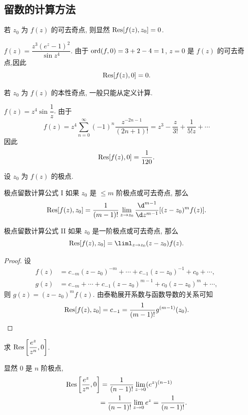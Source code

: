 \subsection{留数的计算方法}

若 $z_0$ 为 $f(z)$ 的可去奇点, 则显然 ${\mathrm{Res}}[f(z),z_0]=0$.

\begin{example}
		$f(z)=\dfrac{z^3(e^z-1)^2}{\sin z^4}$.
	{由于 ${\mathrm{ord}}(f,0)=3+2-4=1$, $z=0$ 是 $f(z)$ 的可去奇点,因此 \[{\mathrm{Res}}[f(z),0]=0.\]
	}
\end{example}

若 $z_0$ 为 $f(z)$ 的本性奇点, 一般只能从定义计算.

\begin{example}
	$f(z)=z^4\sin\dfrac1z$.
{%
	由于
	\[f(z)=z^4\sum_{n=0}^\infty(-1)^n\frac{z^{-2n-1}}{(2n+1)!}
	=z^3-\frac z{3!}+\frac1{5!z}+\cdots\]
}
{%
	因此 \[{\mathrm{Res}}[f(z),0]=\frac1{120}.\]
}
\end{example}

设 $z_0$ 为 $f(z)$ 的极点.

\begin{theorem}{极点留数计算公式 I}
	如果 $z_0$ 是 $\le m$ 阶极点或可去奇点, 那么
	\[\Res[f(z),z_0]=\frac1{(m-1)!}\lim_{z\to z_0}\frac{\d^{m-1}}{\d z^{m-1}}[(z-z_0)^mf(z)].\]
\end{theorem}

\begin{theorem}{极点留数计算公式 II}
	如果 $z_0$ 是一阶极点或可去奇点, 那么
	\[\Res[f(z),z_0]=\liml_{z\to z_0}(z-z_0)f(z).\]
\end{theorem}

\begin{proof}
	设
	\begin{align*}
		f(z)&=c_{-m}(z-z_0)^{-m}+\cdots+c_{-1}(z-z_0)^{-1}+c_0+\cdots,\\
		g(z)&=c_{-m}+\cdots+c_{-1}(z-z_0)^{m-1}+c_0(z-z_0)^m+\cdots,
	\end{align*}
{%
	则 $g(z)=(z-z_0)^mf(z)$.
}%
{%
	由泰勒展开系数与函数导数的关系可知
	\[{\mathrm{Res}}[f(z),z_0]=c_{-1}=\dfrac1{(m-1)!}g^{(m-1)}(z_0).\qedhere\]
}
\end{proof}

\begin{example}
	求 ${\mathrm{Res}}\left[\dfrac{e^z}{z^n},0\right]$.
\end{example}

\begin{solution}
		显然 $0$ 是 $n$ 阶极点,
	{\begin{align*}
			{\mathrm{Res}}\left[\frac{e^z}{z^n},0\right]&=\frac1{(n-1)!}\lim_{z\to0}(e^z)^{(n-1)}\\
			&{=\frac1{(n-1)!}\lim_{z\to0}e^z=\frac1{(n-1)!}.}
		\end{align*}
	}
\end{solution}

